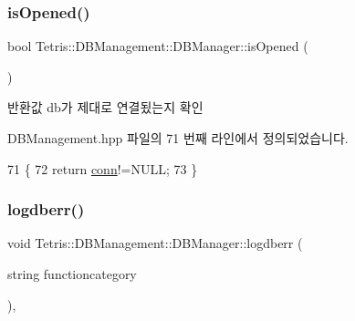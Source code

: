\mbox{\label{class_tetris_1_1_d_b_management_1_1_d_b_manager_a16460066d64c9183a63194177bb0458e}} 
\subsubsection{\texorpdfstring{is\+Opened()}{isOpened()}}
{\footnotesize\ttfamily bool Tetris\+::\+D\+B\+Management\+::\+D\+B\+Manager\+::is\+Opened (\begin{DoxyParamCaption}{ }\end{DoxyParamCaption})\hspace{0.3cm}{\ttfamily [inline]}}

\begin{DoxyReturn}{반환값}
db가 제대로 연결됬는지 확인 
\end{DoxyReturn}


D\+B\+Management.\+hpp 파일의 71 번째 라인에서 정의되었습니다.


\begin{DoxyCode}
71                            \{
72                 \textcolor{keywordflow}{return} \hyperlink{class_tetris_1_1_d_b_management_1_1_d_b_manager_acc2c19420c2b1b1b2c1e724b3a8ec4b7}{conn}!=NULL;
73             \}
\end{DoxyCode}
\mbox{\label{class_tetris_1_1_d_b_management_1_1_d_b_manager_a6b723e555cef747b7402661eb960bd78}} 
\subsubsection{\texorpdfstring{logdberr()}{logdberr()}}
{\footnotesize\ttfamily void Tetris\+::\+D\+B\+Management\+::\+D\+B\+Manager\+::logdberr (\begin{DoxyParamCaption}\item[{string}]{functioncategory }\end{DoxyParamCaption})\hspace{0.3cm}{\ttfamily [inline]}, {\ttfamily [private]}}



